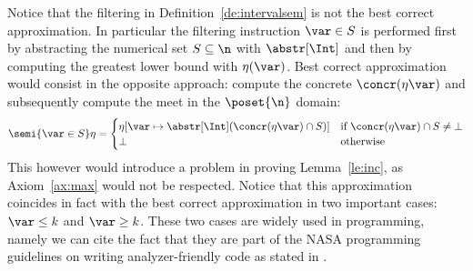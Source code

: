 Notice that the filtering in Definition~\ref{de:intervalsem} is not
the best correct approximation. In particular the filtering
instruction \(\var\in S\) is performed first by abstracting the
numerical set \(S \subseteq \n\) with \(\abstr[\Int]\) and then by
computing the greatest lower bound with \(\eta(\var)\). Best correct
approximation would consist in the opposite approach: compute the
concrete \(\concr(\eta\var)\) and subsequently compute the meet in
the \(\poset{\n}\) domain:
\begin{equation*}
  \semi{\var\in S}\eta = \begin{cases}
    \eta[\var \mapsto \abstr[\Int](\concr(\eta\var) \cap S)]
    & \text{if } \concr(\eta\var) \cap S \neq \bot \\
    \bot & \text{otherwise}
  \end{cases}
\end{equation*}
This however would introduce a problem in proving Lemma~\ref{le:inc},
as Axiom~\ref{ax:max} would not be respected.  Notice that this
approximation coincides in fact with the best correct approximation in
two important cases: \(\var \leq k\) and \(\var \geq k\). These two
cases are widely used in programming, namely we can cite the fact that
they are part of the NASA programming guidelines on writing
analyzer-friendly code as stated in \cite{nasa:ten}.
